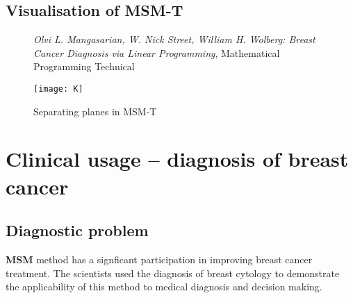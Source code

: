 \documentclass{beamer}
\begin{document}









\subsection{Visualisation of MSM-T}
\begin{frame}
\begin{figure}[h]
	\caption{\textit{Olvi L. Mangasarian, W. Nick Street, William H. Wolberg: Breast Cancer Diagnosis via Linear Programming}, Mathematical Programming Technical \cite{bcd} }
	\centering
	\texttt{[image: K]}
	\caption{Separating planes in MSM-T}\label{rys33}
	
\end{figure}
\end{frame}


\section{Clinical usage -- diagnosis of breast cancer}
\subsection{Diagnostic problem}
\textbf{MSM} method has a signficant participation in improving breast cancer treatment. The scientists used the diagnosis
of breast cytology to demonstrate the applicability of this
method to medical diagnosis and decision making. \\ 



\end{document}
